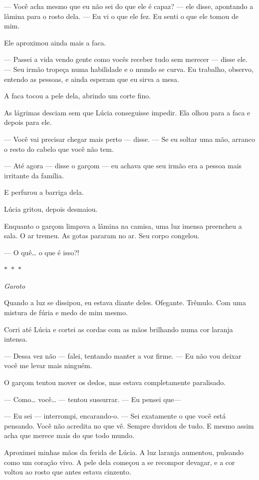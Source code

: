 — Você acha mesmo que eu não sei do que ele é capaz? — ele disse, apontando a lâmina para o rosto dela. — Eu vi o que ele fez. Eu senti o que ele tomou de mim.

Ele aproximou ainda mais a faca.

— Passei a vida vendo gente como vocês receber tudo sem merecer — disse ele. — Seu irmão tropeça numa habilidade e o mundo se curva. Eu trabalho, observo, entendo as pessoas, e ainda esperam que eu sirva a mesa.

A faca tocou a pele dela, abrindo um corte fino.

As lágrimas desciam sem que Lúcia conseguisse impedir. Ela olhou para a faca e depois para ele.

— Você vai precisar chegar mais perto — disse. — Se eu soltar uma mão, arranco o resto do cabelo que você não tem.

— Até agora — disse o garçom — eu achava que seu irmão era a pessoa mais irritante da família.

E perfurou a barriga dela.

Lúcia gritou, depois desmaiou.

\bigskip

Enquanto o garçom limpava a lâmina na camisa, uma luz imensa preencheu a sala.  
O ar tremeu.  
As gotas pararam no ar.  
Seu corpo congelou.

— O quê… o que é isso?!

\begin{center}
$\ast$~$\ast$~$\ast$

\textit{Garoto}
\end{center}

Quando a luz se dissipou, eu estava diante deles.
Ofegante.  
Trêmulo.  
Com uma mistura de fúria e medo de mim mesmo.

Corri até Lúcia e cortei as cordas com as mãos brilhando numa cor laranja intensa.

— Dessa vez não — falei, tentando manter a voz firme. — Eu não vou deixar você me levar mais ninguém.

O garçom tentou mover os dedos, mas estava completamente paralisado.

— Como… você… — tentou sussurrar. — Eu pensei que—

— Eu sei — interrompi, encarando-o. — Sei exatamente o que você está pensando.  
Você não acredita no que vê. Sempre duvidou de tudo.  
E mesmo assim acha que merece mais do que todo mundo.

Aproximei minhas mãos da ferida de Lúcia.  
A luz laranja aumentou, pulsando como um coração vivo.  
A pele dela começou a se recompor devagar, e a cor voltou ao rosto que antes estava cinzento.

